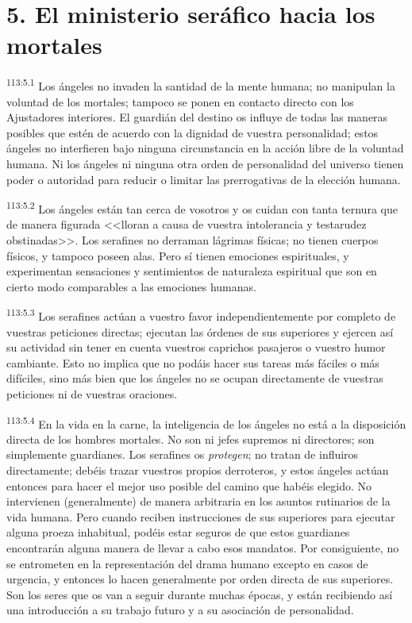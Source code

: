 \section*{5. El ministerio seráfico hacia los mortales}
\par
\textsuperscript{113:5.1} Los ángeles no invaden la santidad de la mente humana; no manipulan la voluntad de los mortales; tampoco se ponen en contacto directo con los Ajustadores interiores. El guardián del destino os influye de todas las maneras posibles que estén de acuerdo con la dignidad de vuestra personalidad; estos ángeles no interfieren bajo ninguna circunstancia en la acción libre de la voluntad humana. Ni los ángeles ni ninguna otra orden de personalidad del universo tienen poder o autoridad para reducir o limitar las prerrogativas de la elección humana.

\par
\textsuperscript{113:5.2} Los ángeles están tan cerca de vosotros y os cuidan con tanta ternura que de manera figurada <<lloran a causa de vuestra intolerancia y testarudez obstinadas>>. Los serafines no derraman lágrimas físicas; no tienen cuerpos físicos, y tampoco poseen alas. Pero sí tienen emociones espirituales, y experimentan sensaciones y sentimientos de naturaleza espiritual que son en cierto modo comparables a las emociones humanas.

\par
\textsuperscript{113:5.3} Los serafines actúan a vuestro favor independientemente por completo de vuestras peticiones directas; ejecutan las órdenes de sus superiores y ejercen así su actividad sin tener en cuenta vuestros caprichos pasajeros o vuestro humor cambiante. Esto no implica que no podáis hacer sus tareas más fáciles o más difíciles, sino más bien que los ángeles no se ocupan directamente de vuestras peticiones ni de vuestras oraciones.

\par
\textsuperscript{113:5.4} En la vida en la carne, la inteligencia de los ángeles no está a la disposición directa de los hombres mortales. No son ni jefes supremos ni directores; son simplemente guardianes. Los serafines os \textit{protegen}; no tratan de influiros directamente; debéis trazar vuestros propios derroteros, y estos ángeles actúan entonces para hacer el mejor uso posible del camino que habéis elegido. No intervienen (generalmente) de manera arbitraria en los asuntos rutinarios de la vida humana. Pero cuando reciben instrucciones de sus superiores para ejecutar alguna proeza inhabitual, podéis estar seguros de que estos guardianes encontrarán alguna manera de llevar a cabo esos mandatos. Por consiguiente, no se entrometen en la representación del drama humano excepto en casos de urgencia, y entonces lo hacen generalmente por orden directa de sus superiores. Son los seres que os van a seguir durante muchas épocas, y están recibiendo así una introducción a su trabajo futuro y a su asociación de personalidad.

